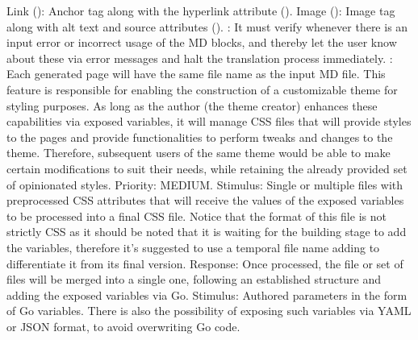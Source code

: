 \markdownRendererUlItem Link (): Anchor tag along with the hyperlink attribute ().\markdownRendererUlItemEnd 
\markdownRendererUlItem Image (): Image tag along with alt text and source attributes ().\markdownRendererUlItemEnd 
\markdownRendererUlEndTight \markdownRendererInterblockSeparator
{}: It must verify whenever there is an input error or incorrect usage of the MD blocks, and thereby let the user know about these via error messages and halt the translation process immediately.\markdownRendererInterblockSeparator
{}: Each generated page will have the same file name as the input MD file.\markdownRendererInterblockSeparator
{}\markdownRendererInterblockSeparator
{}\markdownRendererInterblockSeparator
{}This feature is responsible for enabling the construction of a customizable theme for styling purposes. As long as the author (the theme creator) enhances these capabilities via exposed variables, it will manage CSS files that will provide styles to the pages and provide functionalities to perform tweaks and changes to the theme. Therefore, subsequent users of the same theme would be able to make certain modifications to suit their needs, while retaining the already provided set of opinionated styles. Priority: MEDIUM.\markdownRendererInterblockSeparator
{}\markdownRendererInterblockSeparator
{}Stimulus: Single or multiple files with preprocessed CSS attributes that will receive the values of the exposed variables to be processed into a final CSS file. Notice that the format of this file is not strictly CSS as it should be noted that it is waiting for the building stage to add the variables, therefore it's suggested to use a temporal file name adding  to differentiate it from its final version.\markdownRendererInterblockSeparator
{}Response: Once processed, the file or set of files will be merged into a single one, following an established structure and adding the exposed variables via Go.\markdownRendererInterblockSeparator
{}Stimulus: Authored parameters in the form of Go variables. There is also the possibility of exposing such variables via YAML or JSON format, to avoid overwriting Go code.\markdownRendererInterblockSeparator
